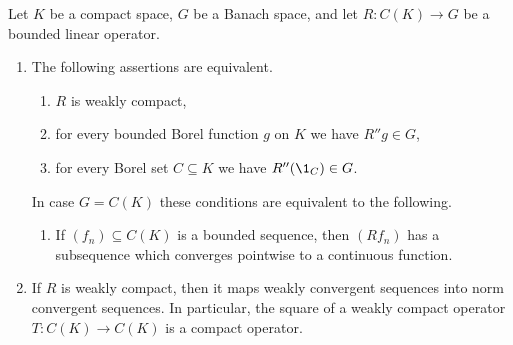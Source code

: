 \begin{proposition}\label{prop:b4-2.4}
	Let $K$ be a compact space, $G$ be a Banach space, and let $R \colon C(K) \to G$ be a bounded linear operator.
	
\begin{enumerate}[\upshape (i)]
    \item
    The following assertions are equivalent.
    \begin{enumerate}[\upshape (a)]
    \item 
    $R$ is weakly compact,

    \item 
    for every bounded Borel function $g$ on $K$ we have $R''g \in G$,

    \item 
    for every Borel set $C \subseteq K$ we have $R''(\1_C) \in G$.
\end{enumerate}
In case $G = C(K)$ these conditions are equivalent to the following.
	\begin{enumerate}
	\item 
	If\/ $(f_n) \subseteq C(K)$ is a bounded sequence, then $(Rf_n)$ has a subsequence which converges pointwise to a continuous function.
    \end{enumerate}
	
\item 
If\/ $R$ is weakly compact, then it maps weakly convergent sequences into norm convergent sequences.
In particular, the square of a weakly
compact operator $T \colon C(K) \to C(K)$ is a compact operator.
\end{enumerate}
\end{proposition}

